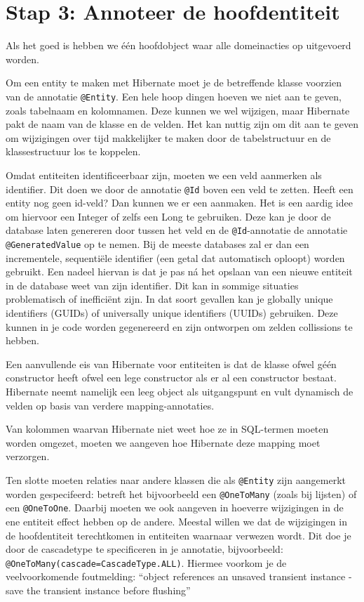 \section{Stap 3: Annoteer de hoofdentiteit}
Als het goed is hebben we één hoofdobject waar alle domeinacties
op uitgevoerd worden.

Om een entity te maken met Hibernate moet 
je de betreffende klasse voorzien van de 
annotatie \texttt{@Entity}. Een hele hoop dingen 
hoeven we niet aan te geven, zoals tabelnaam en kolomnamen.
Deze kunnen we wel wijzigen, maar Hibernate pakt de naam 
van de klasse en de velden. Het kan nuttig zijn om dit aan 
te geven om wijzigingen over tijd makkelijker te maken door
de tabelstructuur en de klassestructuur los te koppelen.

Omdat entiteiten
identificeerbaar zijn, moeten we een veld 
aanmerken als identifier. Dit doen we door de annotatie 
\texttt{@Id} boven een veld te zetten. Heeft een entity
nog geen id-veld? Dan kunnen we er een aanmaken. Het is 
een aardig idee om hiervoor een Integer of zelfs een Long 
te gebruiken. Deze kan je door de database laten genereren 
door tussen het veld en de \texttt{@Id}-annotatie 
de annotatie \texttt{@GeneratedValue} op te nemen. 
Bij de meeste databases zal er dan een incrementele, 
sequentiële identifier (een getal dat automatisch oploopt) 
worden gebruikt. Een nadeel hiervan is dat je pas ná het opslaan 
van een nieuwe entiteit in de database weet van zijn identifier. 
Dit kan in sommige situaties problematisch of inefficiënt zijn.
In dat soort gevallen kan je globally unique identifiers (GUIDs)
of universally unique identifiers (UUIDs) gebruiken. Deze kunnen 
in je code worden gegenereerd en zijn ontworpen om zelden collissions
te hebben.

Een aanvullende eis van Hibernate voor entiteiten is
dat de klasse ofwel géén constructor heeft 
ofwel een lege constructor als er al een constructor bestaat. 
Hibernate neemt namelijk een leeg 
object als uitgangspunt en vult dynamisch de velden op basis van 
verdere mapping-annotaties.

Van kolommen waarvan Hibernate niet weet hoe ze in SQL-termen moeten 
worden omgezet, moeten we aangeven hoe Hibernate deze mapping moet 
verzorgen.

Ten slotte moeten relaties naar andere klassen die als
\texttt{@Entity} zijn aangemerkt worden gespecifeerd:
betreft het bijvoorbeeld een \texttt{@OneToMany} (zoals bij lijsten) of een
\texttt{@OneToOne}. Daarbij moeten we ook aangeven in hoeverre 
wijzigingen in de ene entiteit effect hebben op de andere.
Meestal willen we dat de wijzigingen in de hoofdentiteit 
terechtkomen in entiteiten waarnaar verwezen wordt. 
Dit doe je door de cascadetype te specificeren in je 
annotatie, bijvoorbeeld: \texttt{@OneToMany(cascade=CascadeType.ALL)}. 
Hiermee voorkom je de veelvoorkomende foutmelding: 
``object references an unsaved transient instance 
- save the transient instance before flushing''

